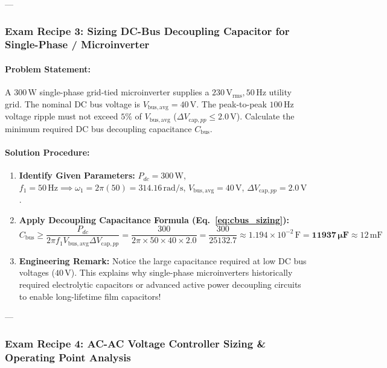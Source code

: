 ---

\subsubsection{Exam Recipe 3: Sizing DC-Bus Decoupling Capacitor for Single-Phase / Microinverter}
\paragraph{Problem Statement:}
A $300\,\si{\watt}$ single-phase grid-tied microinverter supplies a $230\,\si{\volt}_{\mathrm{rms}}, 50\,\si{\hertz}$ utility grid. The nominal DC bus voltage is $V_{\mathrm{bus,avg}} = 40\,\si{\volt}$. The peak-to-peak $100\,\si{\hertz}$ voltage ripple must not exceed $5\%$ of $V_{\mathrm{bus,avg}}$ ($\Delta V_{\mathrm{cap},pp} \le 2.0\,\si{\volt}$). Calculate the minimum required DC bus decoupling capacitance $C_{\mathrm{bus}}$.

\paragraph{Solution Procedure:}
\begin{enumerate}
  \item \textbf{Identify Given Parameters:}
  $P_{dc} = 300\,\si{\watt}$, $f_1 = 50\,\si{\hertz} \implies \omega_1 = 2\pi(50) = 314.16\,\si{\radian\per\second}$, $V_{\mathrm{bus,avg}} = 40\,\si{\volt}$, $\Delta V_{\mathrm{cap},pp} = 2.0\,\si{\volt}$.
  \item \textbf{Apply Decoupling Capacitance Formula (Eq.~\ref{eq:cbus_sizing}):}
  \[
  C_{\mathrm{bus}} \ge \frac{P_{dc}}{2\pi f_1 V_{\mathrm{bus,avg}} \Delta V_{\mathrm{cap},pp}} = \frac{300}{2\pi \times 50 \times 40 \times 2.0} = \frac{300}{25132.7} \approx 1.194 \times 10^{-2}\,\si{\farad} = \mathbf{11937\,\si{\micro\farad}} \approx 12\,\si{\milli\farad}
  \]
  \item \textbf{Engineering Remark:}
  Notice the large capacitance required at low DC bus voltages ($40\,\si{\volt}$). This explains why single-phase microinverters historically required electrolytic capacitors or advanced active power decoupling circuits to enable long-lifetime film capacitors!
\end{enumerate}

---

\subsubsection{Exam Recipe 4: AC-AC Voltage Controller Sizing \& Operating Point Analysis}
